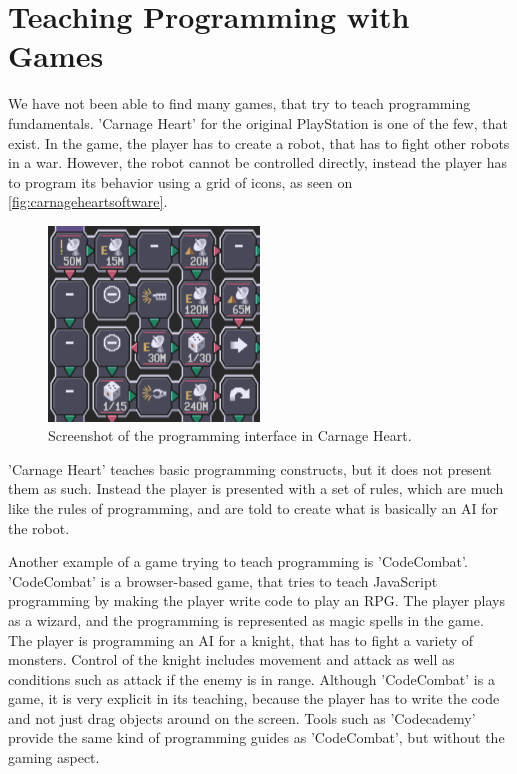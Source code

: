 \section{Teaching Programming with Games}
\label{sec:teachProgWithGames}
We have not been able to find many games, that try to teach programming fundamentals. 'Carnage Heart' for the original PlayStation is one of the few, that exist. In the game, the player has to create a robot, that has to fight other robots in a war. However, the robot cannot be controlled directly, instead the player has to program its behavior using a grid of icons, as seen on \autoref{fig:carnageheartsoftware}.

\begin{figure}[ht]
  \centering
    \includegraphics[width=0.5\textwidth]{img/CarnageHeartSoftware.png}
  \caption{Screenshot of the programming interface in Carnage Heart.\cite{carnageheartsoftware}}
  \label{fig:carnageheartsoftware}
\end{figure}

'Carnage Heart' teaches basic programming constructs, but it does not present them as such. Instead the player is presented with a set of rules, which are much like the rules of programming, and are told to create what is basically an AI for the robot.\newline

Another example of a game trying to teach programming is 'CodeCombat'. \cite{codecombat} 'CodeCombat' is a browser-based game, that tries to teach JavaScript programming by making the player write code to play an RPG. The player plays as a wizard, and the programming is represented as magic spells in the game. The player is programming an AI for a knight, that has to fight a variety of monsters. Control of the knight includes movement and attack as well as conditions such as attack if the enemy is in range.
Although 'CodeCombat' is a game, it is very explicit in its teaching, because the player has to write the code and not just drag objects around on the screen. Tools such as 'Codecademy' provide the same kind of programming guides as 'CodeCombat', but without the gaming aspect.\cite{codecademy}\newline

